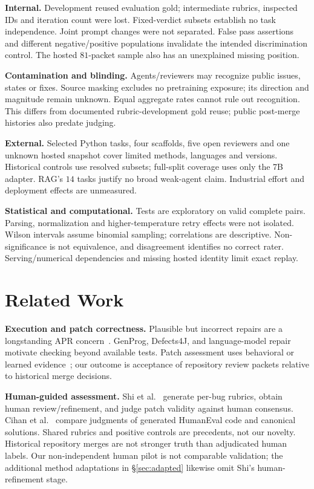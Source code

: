 \documentclass[10pt,conference]{IEEEtran}
\begin{document}
\textbf{Internal.} Development reused evaluation gold; intermediate rubrics,
inspected IDs and iteration count were lost. Fixed-verdict subsets establish no
task independence. Joint prompt changes were not separated. False pass assertions
and different negative/positive populations invalidate the intended discrimination
control. The hosted $81$-packet sample also has an unexplained missing position.

\textbf{Contamination and blinding.} Agents/reviewers may recognize public issues,
states or fixes. Source masking excludes no pretraining exposure; its direction
and magnitude remain unknown. Equal aggregate rates cannot rule out recognition.
This differs from documented rubric-development gold reuse; public post-merge
histories also predate judging.

\textbf{External.} Selected Python tasks, four scaffolds, five open reviewers and
one unknown hosted snapshot cover limited methods, languages and versions.
Historical controls use resolved subsets; full-split coverage uses only the
7B adapter. RAG's $14$ tasks justify no broad weak-agent claim. Industrial effort
and deployment effects are unmeasured.

\textbf{Statistical and computational.} Tests are exploratory on valid complete
pairs. Parsing, normalization and higher-temperature retry effects were not
isolated. Wilson intervals assume binomial sampling; correlations are descriptive.
Non-significance is not equivalence, and disagreement identifies no correct rater.
Serving/numerical dependencies and missing hosted identity limit exact replay.

\section{Related Work}
\textbf{Execution and patch correctness.} Plausible but incorrect repairs are a longstanding
APR concern~\cite{overfitting,qirandom}. GenProg, Defects4J, and language-model
repair~\cite{legoues2012genprog,just2014defects4j,xia2022alpharepair,jiang2023impact}
motivate checking beyond available tests. Patch assessment uses behavioral or learned
evidence~\cite{patchcorrectness,patchsim}; our outcome is acceptance of repository review
packets relative to historical merge decisions.

\textbf{Human-guided assessment.} Shi et al.~\cite{hitlpatch} generate per-bug rubrics,
obtain human review/refinement, and judge patch validity against human consensus.
Cihan et al.~\cite{cihanreview} compare judgments of generated HumanEval code and
canonical solutions. Shared rubrics and positive controls are precedents, not our novelty.
Historical repository merges are not stronger truth than adjudicated human labels.
Our non-independent human pilot is not comparable validation; the additional method
adaptations in \S\ref{sec:adapted} likewise omit Shi's human-refinement stage.
\end{document}
